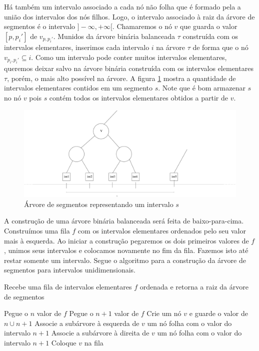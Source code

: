 Há também um intervalo associado a cada nó não folha que é formado pela a união dos intervalos dos nós filhos. Logo, o intervalo associado à raiz da árvore de segmentos é o intervalo $]-\infty, +\infty[$. Chamaremos o nó $v$ que guarda o valor $[p, p_i']$ de $v_{p, p_i'}$.  Munidos da árvore binária balanceada $\tau$ construída com os intervalos elementares, inserimos cada intervalo $i$ na árvore $\tau$ de forma que o nó $v_{p_i, p_i'} \subseteq i$. Como um intervalo pode conter muitos intervalos elementares, queremos deixar salvo na árvore binária construída com os intervalos elementares $\tau$, porém, o mais alto possível na árvore. A figura \ref{fig:segment_tree1} mostra a quantidade de intervalos elementares contidos em um segmento $s$. Note que é bom armazenar $s$ no nó $v$ pois $s$ contém todos os intervalos elementares obtidos a partir de $v$. %

\begin{figure}[h!]
    \centering
    \includegraphics[scale=0.5]{images/elementary_seg_tree.pdf}
    \caption{Árvore de segmentos representando um intervalo $s$ }
    \label{fig:segment_tree1}
\end{figure}

A construção de uma árvore binária balanceada será feita de baixo-para-cima. Construímos uma fila $f$ com os intervalos elementares ordenados pelo seu valor mais à esquerda. Ao iniciar a construção pegaremos os dois primeiros valores de $f$, unimos seus intervalos e colocamos novamente no fim da fila. Fazemos isto até restar somente um intervalo. Segue o algoritmo para a construção da árvore de segmentos para intervalos unidimensionais.

\begin{algorithm}[h!]
    \caption{Recebe uma fila de intervalos elementares $f$ ordenada e retorna a raiz da árvore de segmentos}
    \begin{algorithmic}[1]
                \State Pegue o $n$ valor de $f$
                \State Pegue o $n+1$ valor de $f$
                \State Crie um nó $v$ e guarde o valor de $n \cup n+1 $
                \State Associe a subárvore à esquerda de $v$ um nó folha com o valor do intervalo $n+1$
                \State Associe a subárvore à  direita de $v$ um nó folha com o valor do intervalo $n+1$
                \State Coloque $v$ na fila
            \EndWhile
        \EndFunction
    \end{algorithmic}
\end{algorithm}

